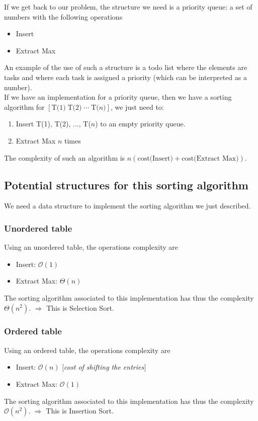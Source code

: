 If we get back to our problem, the structure we need is a priority queue: a set of numbers with the following operations
\begin{itemize}
\item Insert
\item Extract Max
\end{itemize}

An example of the use of such a structure is a todo list where the elements are tasks and where each task is assigned a priority (which can be interpreted as a number).\\

If we have an implementation for a priority queue, then we have a sorting algorithm for $\left[ \text{T(1)} \; \text{T(2)} \; \cdots \; \text{T(}n\text{)} \right]$, we just need to:
\begin{enumerate} 
\item Insert T(1), T(2), ..., T($n$) to an empty priority queue.
\item Extract Max $n$ times
\end{enumerate}
The complexity of such an algorithm is $n \left( \text{cost(Insert)} + \text{cost(Extract Max)} \right)$.

\subsection{Potential structures for this sorting algorithm}

We need a data structure to implement the sorting algorithm we just described. 

\subsubsection{Unordered table} 
Using an unordered table, the operations complexity are \begin{itemize}
\item Insert: $\mathcal{O}(1)$
\item Extract Max: $\Theta (n)$
\end{itemize}
The sorting algorithm associated to this implementation has thus the complexity $\Theta (n^2)$. \newline
$\Rightarrow$ This is Selection Sort.

\subsubsection{Ordered table} 
Using an ordered table, the operations complexity are \begin{itemize}
\item Insert: $\mathcal{O}(n)$ \textit{$[$cost of shifting the entries$]$}
\item Extract Max: $\mathcal{O}(1)$
\end{itemize}
The sorting algorithm associated to this implementation has thus the complexity $\mathcal{O} (n^2)$. \newline
$\Rightarrow$ This is Insertion Sort.

